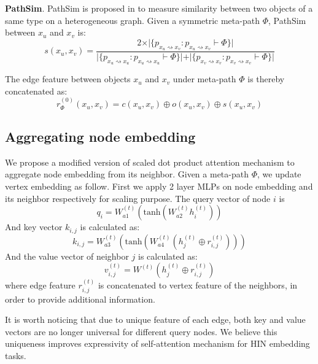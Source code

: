 \noindent{\small$\bullet$}\textbf{PathSim}. 
PathSim is proposed in \citep{SunHYYW11} to measure similarity between two objects of a same type on a heterogeneous graph. Given a symmetric meta-path $\Phi$, PathSim between $x_u$ and $x_v$ is:
\begin{equation*}
s(x_u,x_v) = \frac{2\times\vert\{ p_{x_u \rightsquigarrow x_v}:p_{x_u \rightsquigarrow x_v} \vdash \Phi \}\vert}{\vert\{ p_{x_u \rightsquigarrow x_u}:p_{x_u \rightsquigarrow x_u} \vdash \Phi \}\vert +\vert\{ p_{x_v \rightsquigarrow x_v}:p_{x_v \rightsquigarrow x_v} \vdash \Phi \}\vert }
\end{equation*}

The edge feature between objects $x_u$ and $x_v$ under meta-path $\Phi$ is thereby concatenated as:
\begin{equation}
\label{eq:edge}
r^{(0)}_\Phi(x_u,x_v) = c(x_u,x_v)\oplus o(x_u,x_v)\oplus s(x_u,x_v)
\end{equation}

\subsection{Aggregating node embedding}
We propose a modified version of scaled dot product attention mechanism to aggregate node embedding from its neighbor. Given a meta-path $\Phi$, we update vertex embedding as follow. First we apply 2 layer MLPs on node embedding and its neighbor respectively for scaling purpose. The query vector of node $i$ is
\begin{equation}
\label{eq:query}
q_i= W_{a1}^{(t)}(\text{tanh}(W_{a2}^{(t)}h^{(t)}_i ))
\end{equation}
And key vector $k_{i,j}$ is calculated as:
\begin{equation}
\label{eq:key}
k_{i,j} = W_{a3}^{(t)}(\text{tanh}(W_{a4}^{(t)}(h^{(t)}_j \oplus r^{(t)}_{i,j}) ))
\end{equation}
And the value vector of neighbor $j$ is calculated as: 
\begin{equation}
\label{eq:value}
v^{(t)}_{i,j} = W^{(t)}( h^{(t)}_j \oplus r^{(t)}_{i,j} )
\end{equation} 
where edge feature $r^{(t)}_{i,j}$ is concatenated to vertex feature of the neighbors, in order to provide additional information. 

It is worth noticing that due to unique feature of each edge, both key and value vectors are no longer universal for different query nodes. We believe this uniqueness improves expressivity of self-attention mechanism for HIN embedding tasks.

